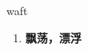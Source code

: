 
\begin{frame}
{\huge waft}
\begin{center}
\begin{enumerate}\Large
  \item \textbf{飘荡，漂浮}
\end{enumerate}
\end{center}
\end{frame}

